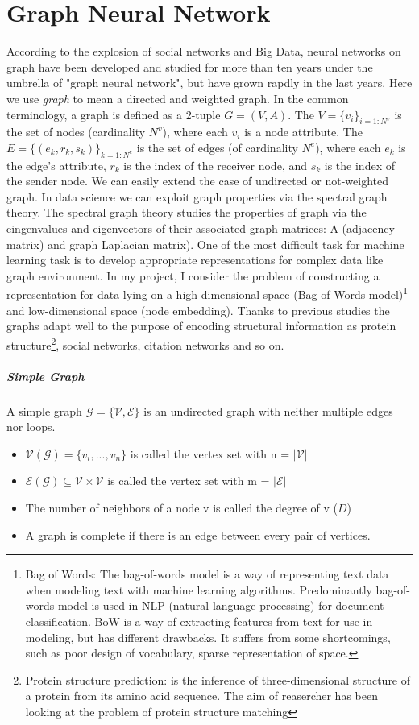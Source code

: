 \documentclass{report}
\begin{document}
\section{Graph Neural Network}
According to the explosion of social networks and Big Data, neural networks on graph have been developed and studied  for more than ten years under the umbrella of "graph neural network", but have grown rapdly in the last years.
Here we use \textit{graph} to mean a directed and weighted graph. In the common terminology, a graph is defined as a 2-tuple $G = ( V, A)$. The $V = \{v_i\}_{i=1:N^v}$ is the set of nodes (cardinality $N^v$), where each $v_i$ is a node attribute. The $E = \{(e_k,r_k,s_k)\}_{k=1:N^e}$ is the set of edges (of cardinality $N^e$), where each $e_k$ is the edge's attribute, $r_k$ is the index of the receiver node, and $s_k$ is the index of the sender node. We can easily extend the case of undirected or not-weighted graph.
In data science we can exploit graph properties via the spectral graph theory. The spectral graph theory studies the properties of graph via the eingenvalues and eigenvectors of their associated graph matrices: A (adjacency matrix) and graph Laplacian matrix).
One of the most difficult task for machine learning task is to develop appropriate representations for complex data like graph environment. 
In my project, I consider the problem of constructing a representation for data lying on a high-dimensional space (Bag-of-Words model)\footnote{Bag of Words: The bag-of-words model is a way of representing text data when modeling text with machine learning algorithms. Predominantly bag-of-words model is used in NLP (natural language processing) for document classification. BoW is a way of extracting features from text for use in modeling, but has different drawbacks. It suffers from some shortcomings, such as poor design of vocabulary, sparse representation of space.} and low-dimensional space (node embedding). Thanks to previous studies the graphs adapt well to the purpose of encoding structural information as protein structure\footnote{Protein structure prediction: is the inference of three-dimensional structure of a protein from its amino acid sequence. The aim of reasercher has been looking at the problem of protein structure matching}, social networks, citation networks and so on.
\subparagraph{Simple Graph}
A simple graph $\mathcal{G}=\{\mathcal{V}, \mathcal{E}\}$ is an undirected graph with neither multiple edges nor loops.
\begin{itemize}
\item $\mathcal{V}(\mathcal{G})= \{v_i,...,v_n\}$ is called the vertex set with n = $|\mathcal{V}|$
\item $\mathcal{E}(\mathcal{G})\subseteq \mathcal{V} \times \mathcal{V}$ is called the vertex set with m = $|\mathcal{E}|$
\item The number of neighbors of a node v is called the degree of v ($D$)
\item A graph is complete if there is an edge between every pair of
vertices.
\end{itemize}
\end{document}
